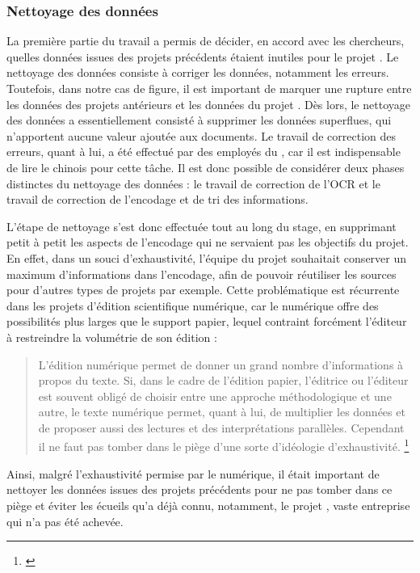 \subsubsection{Nettoyage des données}
La première partie du travail a permis de décider, en accord avec les chercheurs, quelles données issues des projets précédents étaient inutiles pour le projet \COREL. Le nettoyage des données consiste à corriger les données, notamment les erreurs. Toutefois, dans notre cas de figure, il est important de marquer une rupture entre les données des projets antérieurs et les données du projet \COREL. Dès lors, le nettoyage des données a essentiellement consisté à supprimer les données superflues, qui n'apportent aucune valeur ajoutée aux documents. Le travail de correction des erreurs, quant à lui, a été effectué par des employés du \cdf, car il est indispensable de lire le chinois pour cette tâche. Il est donc possible de considérer deux phases distinctes du nettoyage des données : le travail de correction de l'OCR et le travail de \og correction \fg de l'encodage et de tri des informations.

L'étape de nettoyage s'est donc effectuée tout au long du stage, en supprimant petit à petit les aspects de l'encodage qui ne servaient pas les objectifs du projet. En effet, dans un souci d'exhaustivité, l'équipe du projet souhaitait conserver un maximum d'informations dans l'encodage, afin de pouvoir réutiliser les sources pour d'autres types de projets par exemple. Cette problématique est récurrente dans les projets d'édition scientifique numérique, car le numérique offre des possibilités plus larges que le support papier, lequel contraint forcément l'éditeur à restreindre la volumétrie de son édition : 

\begin{quote}
    L’édition numérique permet de donner un grand nombre
d’informations à propos du texte. Si, dans le cadre de l’édition
papier, l’éditrice ou l’éditeur est souvent obligé de choisir
entre une approche méthodologique et une autre, le texte
numérique permet, quant à lui, de multiplier les données et de
proposer aussi des lectures et des interprétations parallèles.
Cependant il ne faut pas tomber dans le piège d’une sorte
d’idéologie d’exhaustivité. \footnote{\cite{vitali_rosati_les_2023}}
\end{quote}

Ainsi, malgré l'exhaustivité permise par le numérique, il était important de nettoyer les données issues des projets précédents pour ne pas tomber dans ce \og piège \fg et éviter les écueils qu'a déjà connu, notamment, le projet \LSC, vaste entreprise qui n'a pas été achevée. 


